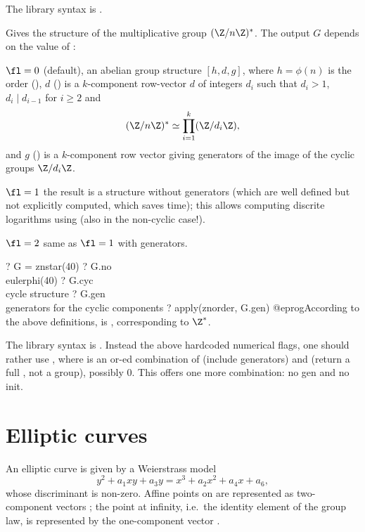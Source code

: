 The library syntax is .

\label{se:znstar}
Gives the structure of the multiplicative group $(\Z/n\Z)^*$.
The output $G$ depends on the value of \fl:

\item $\fl = 0$ (default), an abelian group structure $[h,d,g]$,
where $h = \phi(n)$ is the order (), $d$ ()
is a $k$-component row-vector $d$ of integers $d_i$ such that $d_i>1$,
$d_i \mid d_{i-1}$ for $i \ge 2$ and
$$ (\Z/n\Z)^* \simeq \prod_{i=1}^k (\Z/d_i\Z), $$
and $g$ () is a $k$-component row vector giving generators of
the image of the cyclic groups $\Z/d_i\Z$.

\item $\fl = 1$ the result is a  structure without generators
(which are well defined but not explicitly computed, which saves time);
this allows computing discrite logarithms using  (also in the
non-cyclic case!).

\item $\fl = 2$ same as $\fl = 1$ with generators.

\bprog
? G = znstar(40)
? G.no   \\ eulerphi(40)
? G.cyc  \\ cycle structure
? G.gen  \\ generators for the cyclic components
? apply(znorder, G.gen)
@eprog\noindent According to the above definitions,  is
\kbd{[2, [2], [-1]]}, corresponding to $\Z^*$.

The library syntax is .
Instead the above hardcoded numerical flags, one should rather use
, where  is
an or-ed combination of  (include generators) and 
(return a full , not a group), possibly $0$. This offers
one more combination: no gen and no init.

\section{Elliptic curves}

An elliptic curve is given by a Weierstrass model
$$
  y^2+a_1xy+a_3y=x^3+a_2x^2+a_4x+a_6,
$$
whose discriminant is non-zero. Affine points on  are represented as
two-component vectors \kbd{[x,y]}; the point at infinity, i.e.~the identity
element of the group law, is represented by the one-component vector
\kbd{[0]}.

